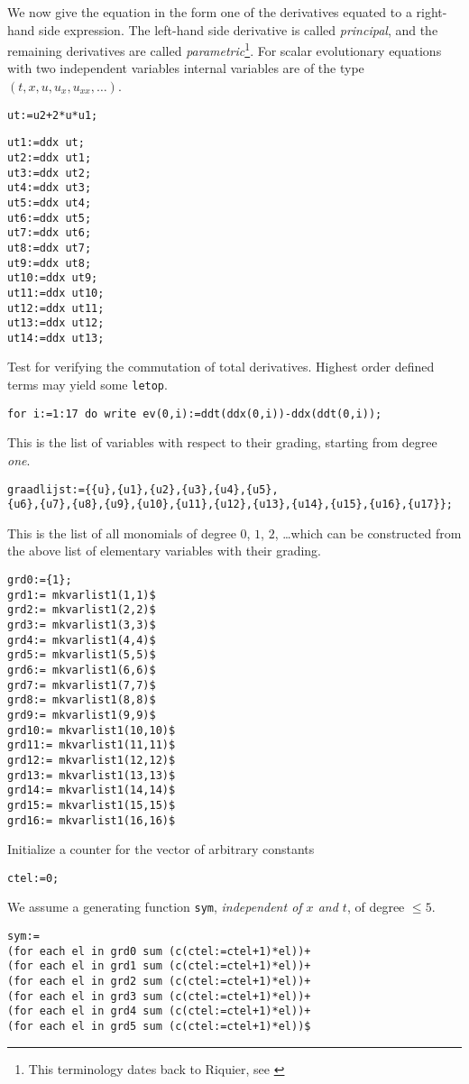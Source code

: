 We now give the equation in the form one of the derivatives equated to a
right-hand side expression. The left-hand side derivative is called
\emph{principal}, and the remaining derivatives are called
\emph{parametric}\footnote{This terminology dates back to Riquier, see
  \cite{Mar}}.  For scalar
evolutionary equations with two independent variables internal variables are of
the type $(t,x,u,u_x,u_{xx},\ldots)$.
\begin{verbatim}
ut:=u2+2*u*u1;
\end{verbatim}

\begin{verbatim}
ut1:=ddx ut;
ut2:=ddx ut1;
ut3:=ddx ut2;
ut4:=ddx ut3;
ut5:=ddx ut4;
ut6:=ddx ut5;
ut7:=ddx ut6;
ut8:=ddx ut7;
ut9:=ddx ut8;
ut10:=ddx ut9;
ut11:=ddx ut10;
ut12:=ddx ut11;
ut13:=ddx ut12;
ut14:=ddx ut13;
\end{verbatim}

Test for verifying the commutation of total derivatives.
Highest order defined terms may yield some \texttt{letop}.
\begin{verbatim}
for i:=1:17 do write ev(0,i):=ddt(ddx(0,i))-ddx(ddt(0,i));
\end{verbatim}

This is the list of variables with respect to their grading,
starting from degree \emph{one}.
\begin{verbatim}
graadlijst:={{u},{u1},{u2},{u3},{u4},{u5},
{u6},{u7},{u8},{u9},{u10},{u11},{u12},{u13},{u14},{u15},{u16},{u17}};
\end{verbatim}

This is the list of all monomials of degree $0$, $1$, $2$, \dots which can be
constructed from the above list of elementary variables with their grading.
\begin{verbatim}
grd0:={1};
grd1:= mkvarlist1(1,1)$
grd2:= mkvarlist1(2,2)$
grd3:= mkvarlist1(3,3)$
grd4:= mkvarlist1(4,4)$
grd5:= mkvarlist1(5,5)$
grd6:= mkvarlist1(6,6)$
grd7:= mkvarlist1(7,7)$
grd8:= mkvarlist1(8,8)$
grd9:= mkvarlist1(9,9)$
grd10:= mkvarlist1(10,10)$
grd11:= mkvarlist1(11,11)$
grd12:= mkvarlist1(12,12)$
grd13:= mkvarlist1(13,13)$
grd14:= mkvarlist1(14,14)$
grd15:= mkvarlist1(15,15)$
grd16:= mkvarlist1(16,16)$
\end{verbatim}

Initialize a counter for the vector of arbitrary constants
\begin{verbatim}
ctel:=0;
\end{verbatim}

We assume a generating function \texttt{sym}, \emph{independent of $x$ and
  $t$}, of degree $\leq 5$.
\begin{verbatim}
sym:=
(for each el in grd0 sum (c(ctel:=ctel+1)*el))+
(for each el in grd1 sum (c(ctel:=ctel+1)*el))+
(for each el in grd2 sum (c(ctel:=ctel+1)*el))+
(for each el in grd3 sum (c(ctel:=ctel+1)*el))+
(for each el in grd4 sum (c(ctel:=ctel+1)*el))+
(for each el in grd5 sum (c(ctel:=ctel+1)*el))$
\end{verbatim}

